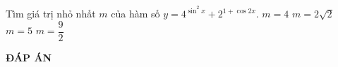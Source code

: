 \begin{ex}%
Tìm giá trị nhỏ nhất $m$ của hàm số $y=4^{\sin^2x}+2^{1+\cos 2x}$.
\choice
{\True $m=4$}
{$m=2\sqrt{2}$}
{$m=5$}
{$m=\dfrac{9}{2}$}
\end{ex}





\newpage
\begin{center}
	\textbf{ĐÁP ÁN}
\end{center}
\begin{multicols}{10}
	 
\end{multicols}
